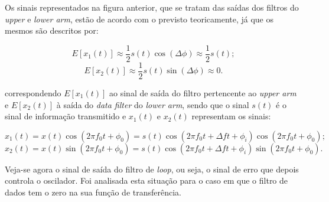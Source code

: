 \documentclass[11pt]{article}
\numberwithin{equation}{section}
\begin{document}
Os sinais representados na figura anterior, que se tratam das saídas dos filtros do \textit{upper} e \textit{lower arm}, estão de acordo com o previsto teoricamente, já que os mesmos são descritos por:

\vspace{-3mm}
\begin{equation}
	E[x_1(t)] \approx \frac{1}{2} s(t) \cos(\Delta \phi) \approx \frac{1}{2}s(t);
\end{equation} 
\vspace{-1mm}
\begin{equation}
E[x_2(t)] \approx \frac{1}{2} s(t) \sin(\Delta \phi) \approx 0.
\end{equation} 

correspondendo $E[x_1(t)]$ ao sinal de saída do filtro pertencente ao \textit{upper arm} e $E[x_2(t)]$ à saída do \textit{data filter} do \textit{lower arm}, sendo que o sinal $s(t)$ é o sinal de informação transmitido e $x_1(t)$ e $x_2(t)$  representam os sinais:

\vspace{-3mm}
\begin{equation}
x_1(t) = x(t)\cos(2\pi f_0t + \phi_0) = s(t)\cos(2\pi f_0t + \Delta ft + \phi_i)\cos(2\pi f_0t + \phi_0);
\end{equation}
\vspace{-4mm}
\begin{equation}
 x_2(t) = x(t)\sin(2\pi
 f_0t + \phi_0) = s(t)\cos(2\pi f_0t + \Delta ft + \phi_i)\sin(2\pi
 f_0t + \phi_0).
\end{equation}

Veja-se agora o sinal de saída do filtro de \textit{loop}, ou seja, o sinal de erro que depois controla o oscilador. Foi analisada esta situação para o caso em que o filtro de dados tem o zero na sua função de transferência. 
\end{document}
